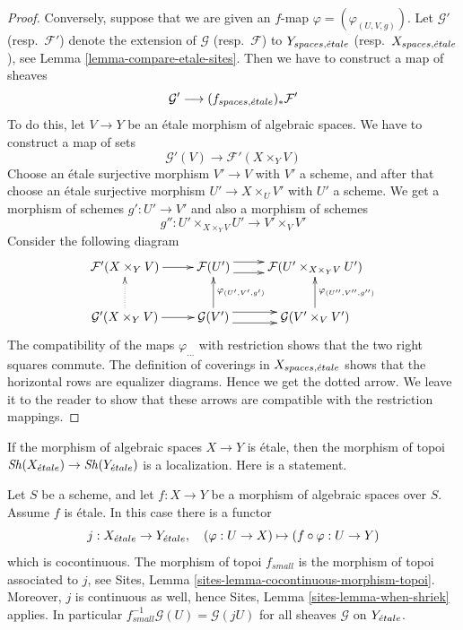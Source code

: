 \begin{proof}
\medskip\noindent
Conversely, suppose that we are given an $f$-map
$\varphi = (\varphi_{(U, V, g)})$.
Let $\mathcal{G}'$ (resp.\ $\mathcal{F}'$) denote the extension of
$\mathcal{G}$ (resp.\ $\mathcal{F}$) to $Y_{spaces, {\acute{e}tale}}$
(resp.\ $X_{spaces, {\acute{e}tale}}$), see
Lemma \ref{lemma-compare-etale-sites}.
Then we have to construct a map of sheaves
$$
\mathcal{G}' \longrightarrow (f_{spaces, {\acute{e}tale}})_*\mathcal{F}'
$$
To do this, let $V \to Y$ be an \'etale morphism of algebraic spaces.
We have to construct a map of sets
$$
\mathcal{G}'(V) \to \mathcal{F}'(X \times_Y V)
$$
Choose an \'etale surjective morphism $V' \to V$ with $V'$ a scheme,
and after that choose an \'etale surjective morphism
$U' \to X \times_U V'$ with $U'$ a scheme. We get a morphism of
schemes $g' : U' \to V'$ and also a morphism of schemes
$$
g'' : U' \times_{X \times_Y V} U' \longrightarrow V' \times_V V'
$$
Consider the following diagram
$$
\xymatrix{
\mathcal{F}'(X \times_Y V) \ar[r] &
\mathcal{F}(U') \ar@<1ex>[r] \ar@<-1ex>[r] &
\mathcal{F}(U' \times_{X \times_Y V} U') \\
\mathcal{G}'(X \times_Y V) \ar[r] \ar@{..>}[u] &
\mathcal{G}(V') \ar@<1ex>[r] \ar@<-1ex>[r] \ar[u]_{\varphi_{(U', V', g')}} &
\mathcal{G}(V' \times_V V') \ar[u]_{\varphi_{(U'', V'', g'')}}
}
$$
The compatibility of the maps $\varphi_{...}$
with restriction shows that the two right squares commute.
The definition of coverings in $X_{spaces, {\acute{e}tale}}$ shows that
the horizontal rows are equalizer diagrams. Hence we get
the dotted arrow. We leave it to the reader to show that these
arrows are compatible with the restriction mappings.
\end{proof}

\noindent
If the morphism of algebraic spaces $X \to Y$ is \'etale, then the morphism
of topoi $\mathop{\mathit{Sh}}\nolimits(X_{\acute{e}tale}) \to \mathop{\mathit{Sh}}\nolimits(Y_{\acute{e}tale})$
is a localization. Here is a statement.

\begin{lemma}
\label{lemma-etale-morphism-topoi}
Let $S$ be a scheme, and let $f : X \to Y$ be a morphism of algebraic spaces
over $S$. Assume $f$ is \'etale. In this case there is a functor
$$
j : X_{\acute{e}tale} \to Y_{\acute{e}tale}, \quad
(\varphi : U \to X) \mapsto (f \circ \varphi : U \to Y)
$$
which is cocontinuous. The morphism of topoi $f_{small}$ is the
morphism of topoi associated to $j$, see
Sites, Lemma \ref{sites-lemma-cocontinuous-morphism-topoi}.
Moreover, $j$ is continuous as well, hence
Sites, Lemma \ref{sites-lemma-when-shriek}
applies. In particular $f_{small}^{-1}\mathcal{G}(U) = \mathcal{G}(jU)$
for all sheaves $\mathcal{G}$ on $Y_{\acute{e}tale}$.
\end{lemma}

